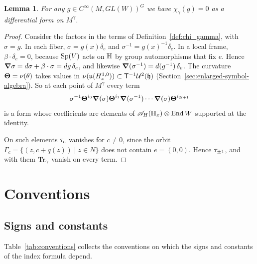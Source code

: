 \documentclass[11pt]{amsart}
\theoremstyle{plain}
\newtheorem{lemma}[theorem]{Lemma}
\theoremstyle{definition}
\theoremstyle{remark}
\begin{document}
\begin{lemma}\label{lem:multiplication classes}
For any $g\in C^\infty(M,GL(W))^G$ 
we have  $\chi_\gamma(g)=0$ as a differential form on $M^\gamma$.
\end{lemma}
\begin{proof}
Consider the factors in the terms of Definition~\ref{def:chi_gamma}, with $\sigma=g$.
In each fiber, $\sigma=g(x)\delta_e$ and $\sigma^{-1}=g(x)^{-1}\delta_e$.
In a local frame, $\beta\cdot\delta_e=0$, because $\mathrm{Sp}(V)$ acts on $\mathbb{H}$ by group automorphisms that fix $e$.
Hence $\boldsymbol{\nabla}\sigma=d\sigma+\beta\cdot\sigma=dg\,\delta_e$, and likewise $\boldsymbol{\nabla}(\sigma^{-1})=d(g^{-1})\,\delta_e$.
The curvature $\boldsymbol{\Theta}=\nu(\theta)$ takes values in $\nu(\mathfrak{u}(H^{1,0}_x))\subset\mathsf{T}^{-1}{\mathcal{U}}^2(\mathfrak{h})$ (Section~\ref{sec:enlarged-symbol-algebra}).
So at each point of $M^\gamma$ every term
\[ \sigma^{-1}\boldsymbol{\Theta}^{i_0}\boldsymbol{\nabla}(\sigma)\boldsymbol{\Theta}^{i_1}\boldsymbol{\nabla}(\sigma^{-1})\cdots\boldsymbol{\nabla}(\sigma)\boldsymbol{\Theta}^{i_{2l+1}}\]
is a form whose coefficients are elements of ${\mathscr{A}}_H(\mathbb{H}_x)\otimes\operatorname{End} W$ supported at the identity.

On such elements $\tau_{c}$ vanishes for $c\ne0$,
since  the orbit $\Gamma_c=\{(z,c+q(z))\mid z\in N\}$ does not contain $e=(0,0)$.
Hence $\tau_{\pm1}$, and with them $\operatorname{Tr}_\gamma$ vanish on every term.

\end{proof}








\appendix
\section{Conventions}\label{sec:conventions}

\subsection*{Signs and constants}

Table~\ref{tab:conventions} collects the conventions on which the signs and constants of the index formula depend.
\end{document}
